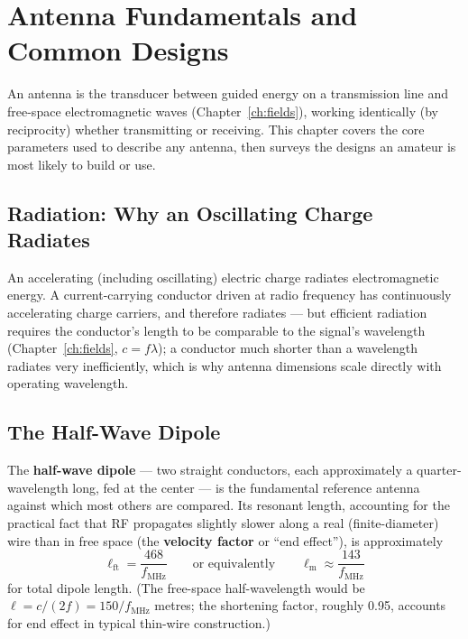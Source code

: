 \chapter{Antenna Fundamentals and Common Designs}
\label{ch:antennas}

An antenna is the transducer between guided energy on a transmission
line and free-space electromagnetic waves (Chapter~\ref{ch:fields}),
working identically (by reciprocity) whether transmitting or receiving.
This chapter covers the core parameters used to describe any antenna,
then surveys the designs an amateur is most likely to build or use.

\section{Radiation: Why an Oscillating Charge Radiates}

An accelerating (including oscillating) electric charge radiates
electromagnetic energy. A current-carrying conductor driven at radio
frequency has continuously accelerating charge carriers, and therefore
radiates --- but efficient radiation requires the conductor's length to
be comparable to the signal's wavelength (Chapter~\ref{ch:fields}, $c =
f\lambda$); a conductor much shorter than a wavelength radiates very
inefficiently, which is why antenna dimensions scale directly with
operating wavelength.

\section{The Half-Wave Dipole}


The \textbf{half-wave dipole} --- two straight conductors, each
approximately a quarter-wavelength long, fed at the center --- is the
fundamental reference antenna against which most others are compared.
Its resonant length, accounting for the practical fact that RF
propagates slightly slower along a real (finite-diameter) wire than in
free space (the \textbf{velocity factor} or ``end effect''), is
approximately
\[
\boxed{\ell_{\text{ft}} = \frac{468}{f_{\text{MHz}}}} \qquad \text{or equivalently} \qquad
\ell_{\text{m}} \approx \frac{143}{f_{\text{MHz}}}
\]
for total dipole length. (The free-space half-wavelength would be
$\ell = c/(2f) = 150/f_{\text{MHz}}$ metres; the shortening factor,
roughly 0.95, accounts for end effect in typical thin-wire
construction.)

